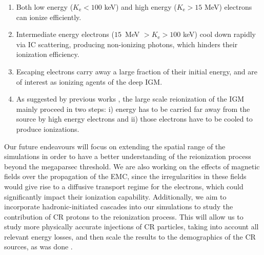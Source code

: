 \documentclass[baaa]{baaa}
\begin{document}
\begin{enumerate}

    \item Both low energy ($K_{\mathrm{e}} < 100$ keV) and high energy ($K_{\mathrm{e}} > 15$ MeV) electrons can ionize efficiently.
    
    \item Intermediate energy electrons ($15$~MeV $> K_{\mathrm{e}} > 100$ keV) cool down rapidly via IC scattering, producing non-ionizing photons, which hinders their ionization efficiency.
    
    \item Escaping electrons carry away a large fraction of their initial energy, and are of interest as ionizing agents of the deep IGM.
    
    \item As suggested by previous works \citep{Douna}, the large scale reionization of the IGM mainly proceed in two steps: i) energy has to be carried far away from the source by high energy electrons and ii) those electrons have to be cooled to produce ionizations. 
    
\end{enumerate}

Our future endeavours will focus on extending the spatial range of the simulations in order to have a better understanding of the reionization process beyond the megaparsec threshold. We are also working on the effects of magnetic fields over the propagation of the EMC, since the irregularities in these fields would give rise to a diffusive transport regime for the electrons, which could significantly impact their ionization capability. Additionally, we aim to incorporate hadronic-initiated cascades into our simulations to study the contribution of CR protons to the reionization process. This will allow us to study more physically accurate injections of CR particles, taking into account all relevant energy losses, and then scale the results to the demographics of the CR sources, as was done \cite{Douna}. 



\small

 
\end{document}
